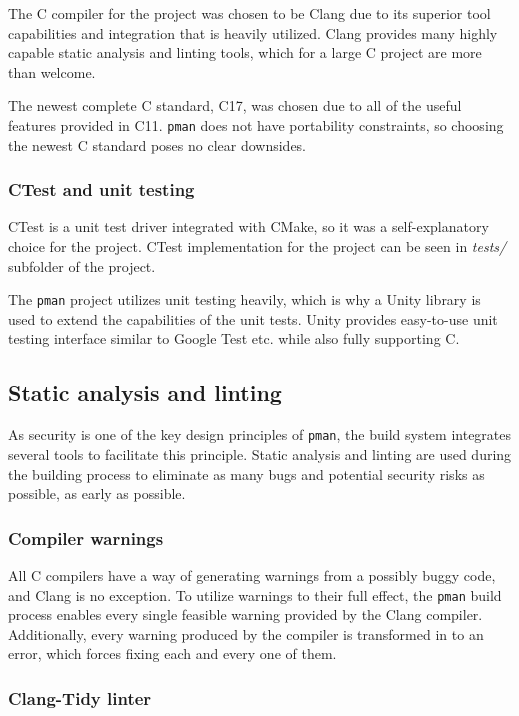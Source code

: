 The C compiler for the project was chosen to be Clang due to its superior tool
capabilities and integration that is heavily utilized. Clang provides many
highly capable static analysis and linting tools, which for a large C project
are more than welcome.

The newest complete C standard, C17, was chosen due to all of the useful
features provided in C11. \texttt{pman} does not have portability constraints,
so choosing the newest C standard poses no clear downsides.

\subsubsection{CTest and unit testing}

CTest is a unit test driver integrated with CMake, so it was a self-explanatory
choice for the project. CTest implementation for the project can be seen in
\textit{tests/} subfolder of the project.

The \texttt{pman} project utilizes unit testing heavily, which is why a Unity
library is used to extend the capabilities of the unit tests. Unity provides
easy-to-use unit testing interface similar to Google Test etc. while also fully
supporting C.

\subsection{Static analysis and linting}

As security is one of the key design principles of \texttt{pman}, the build
system integrates several tools to facilitate this principle. Static analysis
and linting are used during the building process to eliminate as many bugs and
potential security risks as possible, as early as possible.

\subsubsection{Compiler warnings}

All C compilers have a way of generating warnings from a possibly buggy code,
and Clang is no exception. To utilize warnings to their full effect, the
\texttt{pman} build process enables every single feasible warning provided by
the Clang compiler. Additionally, every warning produced by the compiler is
transformed in to an error, which forces fixing each and every one of them.

\subsubsection{Clang-Tidy linter}

